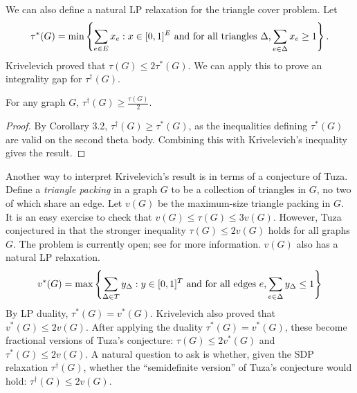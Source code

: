 We can also define a natural LP relaxation for the triangle cover problem. Let
$$\tau^*(G) = \min \left\{\sum_{e \in E} x_e: x \in [0,1]^E \hbox{ and for all triangles $\Delta$,} \sum_{e \in \Delta} x_e \ge 1\right\}.$$
Krivelevich \cite{krivelevich} proved that $\tau(G) \le 2\tau^*(G)$. We can apply this to prove an integrality gap for $\tau^\dagger(G)$.
\begin{theorem}
For any graph $G$, $\tau^\dagger(G) \ge \frac{\tau(G)}{2}$.
\end{theorem}
\begin{proof}
By Corollary 3.2, $\tau^\dagger(G) \ge \tau^*(G)$, as the inequalities defining $\tau^*(G)$ are valid on the second theta body. Combining this with Krivelevich's inequality gives the result.
\end{proof}

Another way to interpret Krivelevich's result is in terms of a conjecture of Tuza. Define a {\it triangle packing} in a graph $G$ to be a collection of triangles in $G$, no two of which share an edge. Let $v(G)$ be the maximum-size triangle packing in $G$. It is an easy exercise to check that $v(G) \le \tau(G) \le 3v(G)$. However, Tuza conjectured in \cite{tuza} that the stronger inequality $\tau(G) \le 2v(G)$ holds for all graphs $G$. The problem is currently open; see \cite{haxell} for more information. $v(G)$ also has a natural LP relaxation.
$$v^*(G) = \max \left\{\sum_{\Delta \in T} y_\Delta: y \in [0,1]^T \hbox{ and for all edges $e$,} \sum_{e \in \Delta} y_\Delta \le 1\right\}$$
By LP duality, $\tau^*(G) = v^*(G)$. Krivelevich also proved that  $v^*(G) \le 2v(G)$. After applying the duality $\tau^*(G) = v^*(G)$, these become fractional versions of Tuza's conjecture: $\tau(G) \le 2v^*(G)$ and $\tau^*(G) \le 2v(G)$. A natural question to ask is whether, given the SDP relaxation $\tau^\dagger(G)$, whether the ``semidefinite version'' of Tuza's conjecture would hold: $\tau^\dagger(G) \le 2v(G)$.





